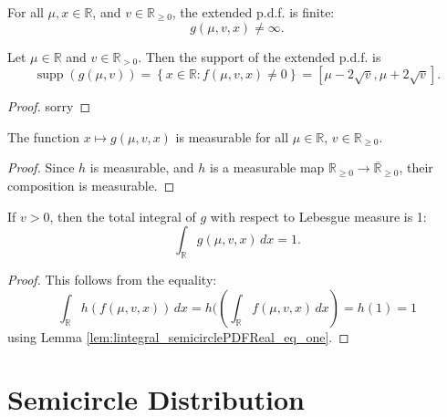 \begin{lemma}
  \label{lem:semicirclePDF_ne_top}
  For all \( \mu, x \in \mathbb{R} \), and \( v \in \mathbb{R}_{\ge 0} \), the extended p.d.f. is finite:
  \[
    g(\mu,v,x) \ne \infty.
  \]
\end{lemma}

\begin{lemma}
  \label{lem:support_semicirclePDF}
  Let \( \mu \in \mathbb{R} \) and \( v \in \mathbb{R}_{> 0} \). Then the support of the extended p.d.f. is
  \[
    \operatorname{supp}(g(\mu,v)) = \left\{ x \in \mathbb{R} : f(\mu,v,x) \ne 0 \right\}
    = \left[ \mu - 2\sqrt{v}, \mu + 2\sqrt{v} \right].
  \]
\end{lemma}
\begin{proof}
    sorry
\end{proof}

\begin{lemma}
  \label{lem:measurable_semicirclePDF}
  The function \( x \mapsto g(\mu,v,x) \) is measurable for all \( \mu \in \mathbb{R} \), \( v \in \mathbb{R}_{\ge 0} \).
\end{lemma}
\begin{proof}
  Since $h$ is measurable, and $h$ is a measurable map \( \mathbb{R}_{\ge 0} \to \overline{\mathbb{R}}_{\ge 0} \), their composition is measurable.
\end{proof}

\begin{lemma}
  \label{lem:lintegral_semicirclePDF_eq_one}
  If \( v > 0 \), then the total integral of \( g \) with respect to Lebesgue measure is 1:
  \[
    \int_{\mathbb{R}} g(\mu,v,x) \, dx = 1.
  \]
\end{lemma}
\begin{proof}
  This follows from the equality:
  \[
  \int_{\mathbb{R}} h(f(\mu,v,x)) \, dx = h( \left( \int_{\mathbb{R}} f(\mu,v,x) \, dx \right) = h(1) = 1
  \]
  using Lemma \ref{lem:lintegral_semicirclePDFReal_eq_one}.
\end{proof}



\section{Semicircle Distribution}


